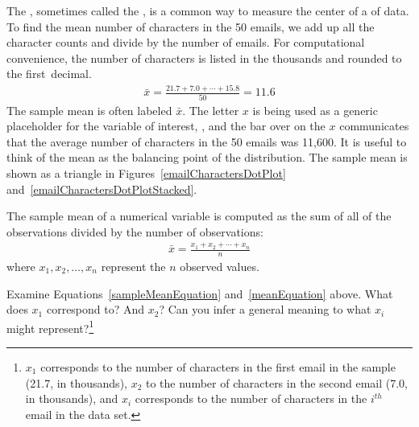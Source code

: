 The , sometimes called the , is a common way to measure the center of a  of data. To find the mean number of characters in the 50 emails, we add up all the character counts and divide by the number of emails. For computational convenience, the number of characters is listed in the thousands and rounded to the first~decimal.
\begin{eqnarray}
\bar{x} = \frac{21.7 + 7.0 + \cdots + 15.8}{50} = 11.6
\label{sampleMeanEquation}
\end{eqnarray}
The sample mean is often labeled $\bar{x}$. The letter $x$ is being used as a generic placeholder for the variable of interest, , and the bar over on the $x$ communicates that the average number of characters in the 50 emails was 11,600. It is useful to think of the mean as the balancing point of the distribution. The sample mean is shown as a triangle in Figures~\ref{emailCharactersDotPlot} and~\ref{emailCharactersDotPlotStacked}.

\begin{termBox}{%
The sample mean of a numerical variable is computed as the sum of all of the observations divided by the number of observations:
\begin{eqnarray}
\bar{x} = \frac{x_1+x_2+\cdots+x_n}{n}
\label{meanEquation}
\end{eqnarray}
where $x_1, x_2, \dots, x_n$ represent the $n$ observed values.}
\end{termBox}\vspace{-2mm}

\begin{exercise}
Examine Equations~\eqref{sampleMeanEquation} and~\eqref{meanEquation} above. What does $x_1$ correspond to? And $x_2$? Can you infer a general meaning to what $x_i$ might represent?\footnote{$x_1$ corresponds to the number of characters in the first email in the sample (21.7, in thousands), $x_2$ to the number of characters in the second email (7.0, in thousands), and $x_i$ corresponds to the number of characters in the $i^{th}$ email in the data set.}
\end{exercise}

